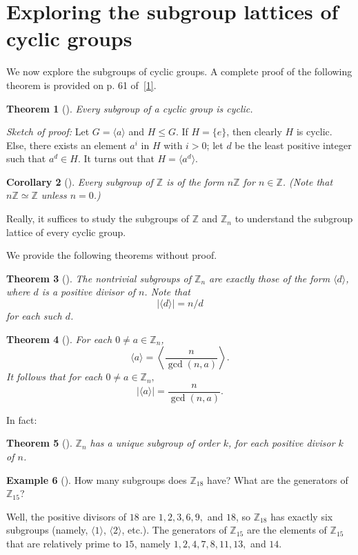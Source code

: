 \documentclass[10pt,]{book}
\theoremstyle{plain}
\newtheorem{theorem}{Theorem}[section]
\newtheorem{corollary}[theorem]{Corollary}
\theoremstyle{definition}
\theoremstyle{definition}
\theoremstyle{definition}
\newtheorem{example}[theorem]{Example}
\theoremstyle{definition}
\numberwithin{equation}{section}
\def\Z{\mathbb{Z}}
\begin{document}
\section[{Exploring the subgroup lattices of cyclic groups}]{Exploring the subgroup lattices of cyclic groups}\label{section-16}
We now explore the subgroups of cyclic groups. A complete proof of the following theorem is provided on p. 61 of~\hyperlink{F}{[1]}.%
\begin{theorem}[{}]\label{subc}
Every subgroup of a cyclic group is cyclic.%
\end{theorem}
\emph{Sketch of proof:} Let \(G=\langle a\rangle\) and \(H\leq G\). If \(H=\{e\}\), then clearly \(H\) is cyclic. Else, there exists an element \(a^i\) in \(H\) with \(i>0\); let \(d\) be the least positive integer such that \(a^d\in H\). It turns out that \(H=\langle a^d\rangle\).%
\begin{corollary}[{}]\label{corollary-5}
Every subgroup of \(\Z\) is of the form \(n\Z\) for \(n\in \Z\). (Note that \(n\Z\simeq \Z\) unless \(n=0\).)%
\end{corollary}
Really, it suffices to study the subgroups of \(\Z\) and \(\Z_n\) to understand the subgroup lattice of every cyclic group.%
\par
We provide the following theorems without proof.%
\begin{theorem}[{}]\label{znsubgps}
The nontrivial subgroups of \(\Z_n\) are exactly those of the form \(\langle d\rangle\), where \(d\) is a positive divisor of \(n\). Note that%
\begin{equation*}
|\langle d\rangle |=n/d
\end{equation*}
for each such \(d\).%
\end{theorem}
\begin{theorem}[{}]\label{theorem-30}
For each \(0\neq a\in \Z_n\),%
\begin{equation*}
\langle a\rangle =\left\langle \frac{n}{\gcd(n,a)}\right\rangle.
\end{equation*}
It follows that for each \(0\neq a \in \Z_n,\)%
\begin{equation*}
|\langle a\rangle |=\frac{n}{\gcd(n,a)}.
\end{equation*}
%
\end{theorem}
In fact:%
\begin{theorem}[{}]\label{theorem-31}
\(\Z_n\) has a unique subgroup of order \(k\), for each positive divisor \(k\) of \(n\).%
\end{theorem}
\begin{example}[]\label{example-46}
How many subgroups does \(\Z_{18}\) have? What are the generators of \(\Z_{15}\)?%
\par
Well, the positive divisors of \(18\) are \(1,2,3,6,9,\) and \(18\), so \(\Z_{18}\) has exactly six subgroups (namely, \(\langle 1\rangle\), \(\langle 2\rangle\), etc.). The generators of \(\Z_{15}\) are the elements of \(\Z_{15}\) that are relatively prime to \(15\), namely \(1,2,4,7,8,11,13,\) and \(14\).%
\end{example}
\end{document}
